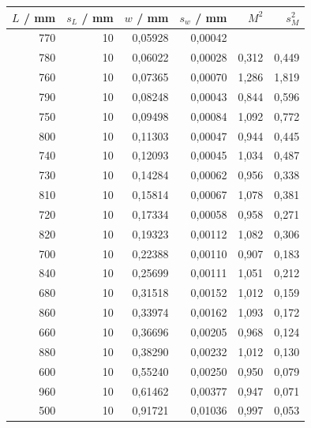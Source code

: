 \begin{table}
    \centering
    \begin{tabular}{rrrrrr}
        \toprule
        $L$ / mm &  $s_L$ / mm &    $w$ / mm &  $s_w$ / mm&     $M^2$ &        $s_M^2$ \\
        \midrule
        770 &  10 &  0,05928 &  0,00042 &        &        \\
        780 &  10 &  0,06022 &  0,00028 &  0,312 &  0,449 \\
        760 &  10 &  0,07365 &  0,00070 &  1,286 &  1,819 \\
        790 &  10 &  0,08248 &  0,00043 &  0,844 &  0,596 \\
        750 &  10 &  0,09498 &  0,00084 &  1,092 &  0,772 \\
        800 &  10 &  0,11303 &  0,00047 &  0,944 &  0,445 \\
        740 &  10 &  0,12093 &  0,00045 &  1,034 &  0,487 \\
        730 &  10 &  0,14284 &  0,00062 &  0,956 &  0,338 \\
        810 &  10 &  0,15814 &  0,00067 &  1,078 &  0,381 \\
        720 &  10 &  0,17334 &  0,00058 &  0,958 &  0,271 \\
        820 &  10 &  0,19323 &  0,00112 &  1,082 &  0,306 \\
        700 &  10 &  0,22388 &  0,00110 &  0,907 &  0,183 \\
        840 &  10 &  0,25699 &  0,00111 &  1,051 &  0,212 \\
        680 &  10 &  0,31518 &  0,00152 &  1,012 &  0,159 \\
        860 &  10 &  0,33974 &  0,00162 &  1,093 &  0,172\\
        660 &  10 &  0,36696 &  0,00205 &  0,968 &  0,124 \\
        880 &  10 &  0,38290 &  0,00232 &  1,012 &  0,130 \\
        600 &  10 &  0,55240 &  0,00250 &  0,950 &  0,079 \\
        960 &  10 &  0,61462 &  0,00377 &  0,947 &  0,071 \\
        500 &  10 &  0,91721 &  0,01036 &  0,997 &  0,053 \\
        \bottomrule
    \end{tabular}
    \label{tab:M}
\end{table}

